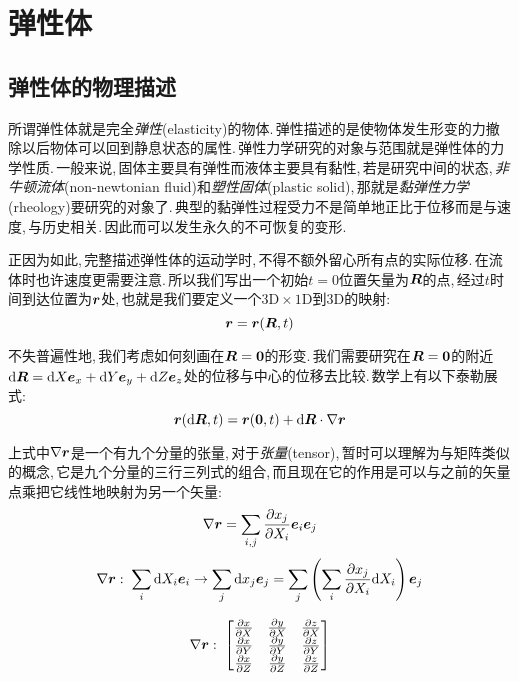 \chapter{弹性体}


\section{弹性体的物理描述}

所谓弹性体就是完全\emph{弹性}(elasticity)的物体.\,弹性描述的是使物体发生形变的力撤除以后物体可以回到静息状态的属性.\,弹性力学研究的对象与范围就是弹性体的力学性质.\,一般来说,\,固体主要具有弹性而液体主要具有黏性,\,若是研究中间的状态,\,\emph{非牛顿流体}(non-newtonian fluid)和\emph{塑性固体}(plastic solid),\,那就是\emph{黏弹性力学}(rheology)要研究的对象了.\,典型的黏弹性过程受力不是简单地正比于位移而是与速度,\,与历史相关.\,因此而可以发生永久的不可恢复的变形.

正因为如此,\,完整描述弹性体的运动学时,\,不得不额外留心所有点的实际位移.\,在流体时也许速度更需要注意.\,所以我们写出一个初始$t=0$位置矢量为$\boldsymbol{R}$的点,\,经过$t$时间到达位置为$\boldsymbol{r}$处,\,也就是我们要定义一个$\mathrm{3D}\times\mathrm{1D}$到$\mathrm{3D}$的映射:
\[\boldsymbol{r}=\boldsymbol{r}(\boldsymbol{R},t)\]

不失普遍性地,\,我们考虑如何刻画在$\boldsymbol{R}=\boldsymbol{0}$的形变.\,我们需要研究在$\boldsymbol{R}=\boldsymbol{0}$的附近$\textrm{d} \boldsymbol{R}=\textrm{d} X\boldsymbol{e}_x+\textrm{d} Y\boldsymbol{e}_y+\textrm{d} Z\boldsymbol{e}_z$处的位移与中心的位移去比较.\,数学上有以下泰勒展式:
\[\boldsymbol{r}(\textrm{d} \boldsymbol{R},t)=\boldsymbol{r}(\boldsymbol{0},t)+\textrm{d} \boldsymbol{R}\cdot \nabla \boldsymbol{r}\]

上式中$\nabla\boldsymbol{r}$是一个有九个分量的张量,\,对于\emph{张量}(tensor),\,暂时可以理解为与矩阵类似的概念,\,它是九个分量的三行三列式的组合,\,而且现在它的作用是可以与之前的矢量点乘把它线性地映射为另一个矢量:
\[\nabla\boldsymbol{r}=\sum_{i,j}\frac{\partial x_j}{\partial X_i}\boldsymbol{e}_i\boldsymbol{e}_j\]
\[\nabla\boldsymbol{r}:\; \sum_i\textrm{d} X_i\boldsymbol{e}_i\rightarrow \sum_j\textrm{d} x_j\boldsymbol{e}_j=\sum_j\left(\sum_i \frac{\partial x_j}{\partial X_i}\textrm{d} X_i\right)\boldsymbol{e}_j\]

\[\nabla\boldsymbol{r}:\; \begin{bmatrix}\frac{\partial x}{\partial X}&\frac{\partial y}{\partial X}&\frac{\partial z}{\partial X}\\\frac{\partial x}{\partial Y}&\frac{\partial y}{\partial Y}&\frac{\partial z}{\partial Y}\\\frac{\partial x}{\partial Z}&\frac{\partial y}{\partial Z}&\frac{\partial z}{\partial Z}\end{bmatrix}\]

